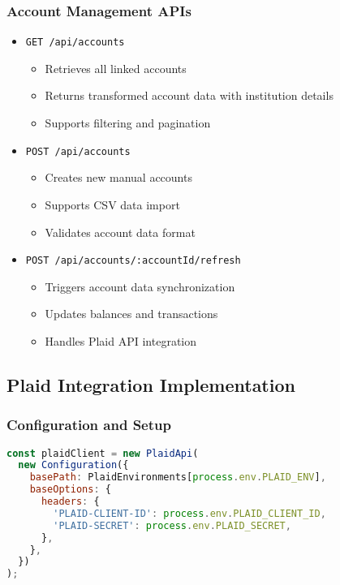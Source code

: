 \documentclass[conference]{IEEEtran}
\begin{document}
\subsubsection{Account Management APIs}
\begin{itemize}
\item \texttt{GET /api/accounts}
\begin{itemize}
\item Retrieves all linked accounts
\item Returns transformed account data with institution details
\item Supports filtering and pagination
\end{itemize}

\item \texttt{POST /api/accounts}
\begin{itemize}
\item Creates new manual accounts
\item Supports CSV data import
\item Validates account data format
\end{itemize}

\item \texttt{POST /api/accounts/:accountId/refresh}
\begin{itemize}
\item Triggers account data synchronization
\item Updates balances and transactions
\item Handles Plaid API integration
\end{itemize}
\end{itemize}

\subsection{Plaid Integration Implementation}
\subsubsection{Configuration and Setup}
\begin{lstlisting}[language=JavaScript, caption=Plaid API Configuration]
const plaidClient = new PlaidApi(
  new Configuration({
    basePath: PlaidEnvironments[process.env.PLAID_ENV],
    baseOptions: {
      headers: {
        'PLAID-CLIENT-ID': process.env.PLAID_CLIENT_ID,
        'PLAID-SECRET': process.env.PLAID_SECRET,
      },
    },
  })
);
\end{lstlisting}
\end{document}
